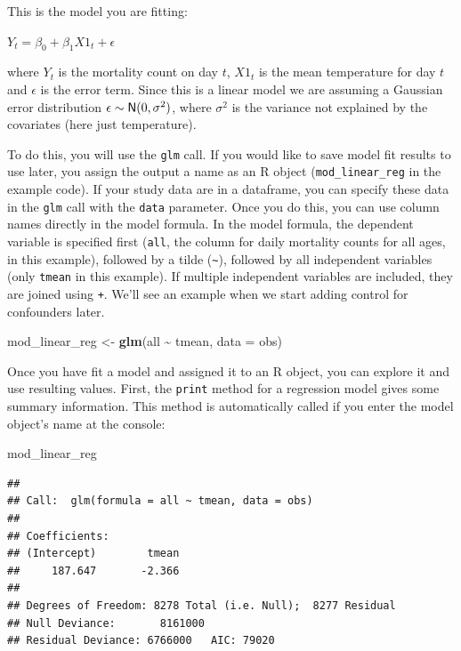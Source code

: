 \documentclass[
]{book}
\newenvironment{Shaded}{\begin{snugshade}}{\end{snugshade}}
\newcommand{\AttributeTok}[1]{\textcolor[rgb]{0.13,0.29,0.53}{#1}}
\newcommand{\FunctionTok}[1]{\textcolor[rgb]{0.13,0.29,0.53}{\textbf{#1}}}
\newcommand{\NormalTok}[1]{#1}
\newcommand{\OtherTok}[1]{\textcolor[rgb]{0.56,0.35,0.01}{#1}}
\newcommand{\SpecialCharTok}[1]{\textcolor[rgb]{0.81,0.36,0.00}{\textbf{#1}}}
\begin{document}
This is the model you are fitting:

\(Y_{t}=\beta_{0}+\beta_{1}X1_{t}+\epsilon\)

where \(Y_{t}\) is the mortality count on day \(t\), \(X1_{t}\) is the mean temperature
for day \(t\) and \(\epsilon\) is the error term. Since this is a linear model we are
assuming a Gaussian error distribution \(\epsilon \sim {\sf N}(0, \sigma^{2})\),
where \(\sigma^{2}\) is the variance not explained by the covariates (here just
temperature).

To do this, you will use the \texttt{glm} call. If you would like to save model fit
results to use later, you assign the output a name as an R object
(\texttt{mod\_linear\_reg} in the example code). If your study data are in a dataframe,
you can specify these data in the \texttt{glm} call with the \texttt{data} parameter.
Once you do this, you can use column names directly in the model formula.
In the model formula, the dependent variable is specified first (\texttt{all}, the
column for daily mortality counts for all ages, in this example), followed
by a tilde (\texttt{\textasciitilde{}}), followed by all independent variables (only \texttt{tmean} in this
example). If multiple independent variables are included, they are joined using
\texttt{+}. We'll see an example when we start adding control for confounders later.

\begin{Shaded}
\begin{Highlighting}[]
\NormalTok{mod\_linear\_reg }\OtherTok{\textless{}{-}} \FunctionTok{glm}\NormalTok{(all }\SpecialCharTok{\textasciitilde{}}\NormalTok{ tmean, }\AttributeTok{data =}\NormalTok{ obs)}
\end{Highlighting}
\end{Shaded}

Once you have fit a model and assigned it to an R object, you can explore it
and use resulting values. First, the \texttt{print} method for a regression model
gives some summary information. This method is automatically called if you
enter the model object's name at the console:

\begin{Shaded}
\begin{Highlighting}[]
\NormalTok{mod\_linear\_reg}
\end{Highlighting}
\end{Shaded}

\begin{verbatim}
## 
## Call:  glm(formula = all ~ tmean, data = obs)
## 
## Coefficients:
## (Intercept)        tmean  
##     187.647       -2.366  
## 
## Degrees of Freedom: 8278 Total (i.e. Null);  8277 Residual
## Null Deviance:       8161000 
## Residual Deviance: 6766000   AIC: 79020
\end{verbatim}
\end{document}

